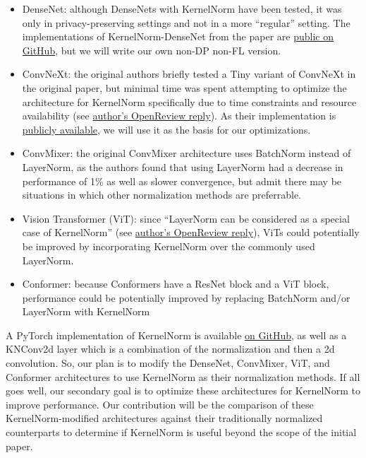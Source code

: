 \documentclass{article}
\begin{document}
\begin{itemize}
    \item DenseNet: although DenseNets with KernelNorm have been tested, it was only in privacy-preserving settings \cite{kernelnormdp2023} and not in a more ``regular'' setting. The implementations of KernelNorm-DenseNet from the paper are \href{https://github.com/reza-nasirigerdeh}{public on GitHub}, but we will write our own non-DP non-FL version.
    \item ConvNeXt: the original authors briefly tested a Tiny variant of ConvNeXt in the original paper, but minimal time was spent attempting to optimize the architecture for KernelNorm specifically due to time constraints and resource availability (see \href{https://openreview.net/forum?id=Uv3XVAEgG6&noteId=2tQNGSCcV}{author's OpenReview reply}). As their implementation is \href{https://github.com/reza-nasirigerdeh/norm-torch/tree/main/models/knconvnext}{publicly available}, we will use it as the basis for our optimizations.
    \item ConvMixer: the original ConvMixer architecture uses BatchNorm instead of LayerNorm, as the authors found that using LayerNorm had a decrease in performance of 1\% as well as slower convergence, but admit there may be situations in which other normalization methods are preferrable.
    \item Vision Transformer (ViT): since ``LayerNorm can be considered as a special case of KernelNorm'' (see \href{https://openreview.net/forum?id=Uv3XVAEgG6&noteId=2tQNGSCcV5}{author's OpenReview reply}), ViTs could potentially be improved by incorporating KernelNorm over the commonly used LayerNorm.
    \item Conformer: because Conformers have a ResNet block and a ViT block, performance could be potentially improved by replacing BatchNorm and/or LayerNorm with KernelNorm 
\end{itemize}

A PyTorch implementation of KernelNorm is available \href{https://github.com/reza-nasirigerdeh}{on GitHub}, as well as a KNConv2d layer which is a combination of the normalization and then a 2d convolution. So, our plan is to modify the DenseNet, ConvMixer, ViT, and Conformer architectures to use KernelNorm as their normalization methods. If all goes well, our secondary goal is to optimize these architectures for KernelNorm to improve performance. Our contribution will be the comparison of these KernelNorm-modified architectures against their traditionally normalized counterparts to determine if KernelNorm is useful beyond the scope of the initial paper. 



\end{document}
